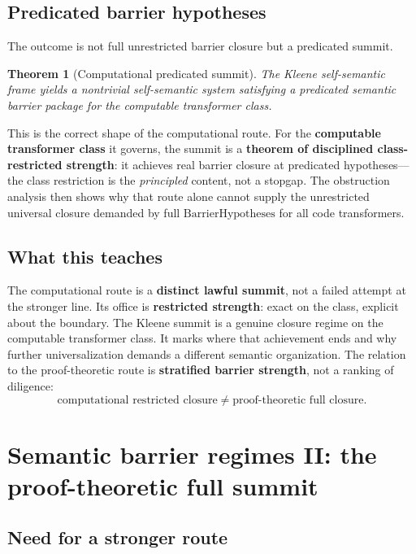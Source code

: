 \documentclass[11pt]{article}
\theoremstyle{plain}
\newtheorem{theorem}{Theorem}[section]
\theoremstyle{definition}
\theoremstyle{remark}
\begin{document}
\subsection{Predicated barrier hypotheses}

The outcome is not full unrestricted barrier closure but a predicated summit.

\begin{theorem}[Computational predicated summit]
The Kleene self-semantic frame yields a nontrivial self-semantic system satisfying a predicated semantic barrier package for the computable transformer class.
\end{theorem}

This is the correct shape of the computational route. For the \textbf{computable transformer class} it governs, the summit is a \textbf{theorem of disciplined class-restricted strength}: it achieves real barrier closure at predicated hypotheses---the class restriction is the \emph{principled} content, not a stopgap. The obstruction analysis then shows why that route alone cannot supply the unrestricted universal closure demanded by full \(\mathrm{BarrierHypotheses}\) for all code transformers.

\subsection{What this teaches}

The computational route is a \textbf{distinct lawful summit}, not a failed attempt at the stronger line. Its office is \textbf{restricted strength}: exact on the class, explicit about the boundary. The Kleene summit is a genuine closure regime on the computable transformer class. It marks where that achievement ends and why further universalization demands a different semantic organization. The relation to the proof-theoretic route is \textbf{stratified barrier strength}, not a ranking of diligence:
\[
\text{computational restricted closure} \neq \text{proof-theoretic full closure}.
\]

\section{Semantic barrier regimes II: the proof-theoretic full summit}

\subsection{Need for a stronger route}
\end{document}
